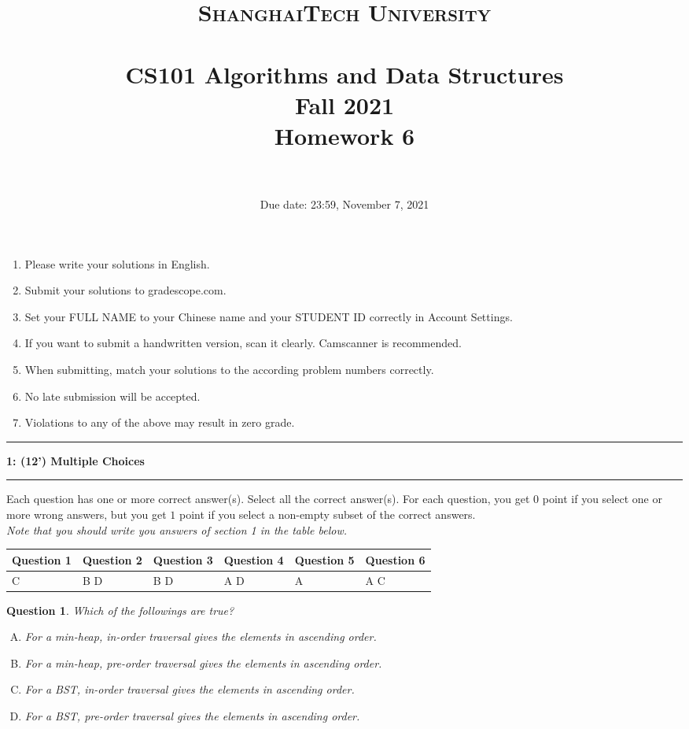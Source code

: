 \documentclass[10.5pt]{article}
\title{
	\normalfont \normalsize
	\textsc{ShanghaiTech University} \\ [25pt]
	\horrule{0.5pt} \\[0.4cm] %
	\huge CS101 Algorithms and Data Structures\\ %
	\LARGE Fall 2021\\
	\LARGE Homework 6\\
	\horrule{2pt} \\[0.5cm] %
}
\author{}
\date{Due date: 23:59, November 7, 2021}
\newcommand\question[2]{\vspace{.25in}\hrule\textbf{#1: #2}\vspace{.5em}\hrule\vspace{.10in}}
\newtheorem{Q}{Question}
\begin{document}
	
	\maketitle
	\thispagestyle{firstpage}
	\vspace{3ex}
	
	\begin{enumerate}
		\item Please write your solutions in English. 
		
		\item Submit your solutions to gradescope.com.  
		
		\item Set your FULL NAME to your Chinese name and your STUDENT ID correctly in Account Settings. 
		
		\item If you want to submit a handwritten version, scan it clearly. Camscanner is recommended. 
		
		\item When submitting, match your solutions to the according problem numbers correctly. 
		
		\item No late submission will be accepted.
		
		\item Violations to any of the above may result in zero grade. 
	\end{enumerate}
	\newpage


\question{1}{(12') Multiple Choices}
	Each question has one or more correct answer(s). Select all the correct answer(s). For each question, you get $0$ point if you select one or more wrong answers, but you get $1$ point if you select a non-empty subset of the correct answers.\\
\textit{Note that you should write you answers of section 1 in the table below.}

\begin{table}[htbp]
	\begin{tabular}{|p{2cm}|p{2cm}|p{2cm}|p{2cm}|p{2cm}|p{2cm}|}
		\hline 
		Question 1 & Question 2 & Question 3 & Question 4 & Question 5 & Question 6  \\ 
		\hline 
		C & B D & B D & A D & A & A C \\ 
		\hline 
	\end{tabular} 
\end{table}

\begin{Q}
	Which of the followings are true? 
	\begin{enumerate}[(A)]
		\item For a min-heap, in-order traversal gives the elements in ascending order.
		\item For a min-heap, pre-order traversal gives the elements in ascending order.
		\item For a BST, in-order traversal gives the elements in ascending order.
		\item For a BST, pre-order traversal gives the elements in ascending order.
	\end{enumerate}
\end{Q}
\end{document}
